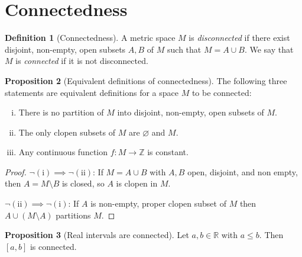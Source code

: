 \documentclass[10pt,fleqn]{article}
\newcommand{\reals}{\mathbb{R}}
\theoremstyle{definition} \newtheorem{defn}{Definition}[section]
\theoremstyle{plain}      \newtheorem{thm}[defn]{Theorem}
\theoremstyle{definition} \newtheorem{prop}[defn]{Proposition}
\theoremstyle{definition} \newtheorem{cor}[defn]{Corollary}
\theoremstyle{definition} \newtheorem{ex}[defn]{Example}
\theoremstyle{definition} \newtheorem{rem}[defn]{Remark}
\begin{document}
\section{Connectedness}

\begin{defn}[Connectedness]
    A metric space $M$ is \emph{disconnected} if there exist disjoint, non-empty, open subsets $A,B$ of $M$ such that $M=A\cup B$.
    We say that $M$ is \emph{connected} if it is not disconnected.
\end{defn}

\begin{prop}[Equivalent definitions of connectedness]
    The following three statements are equivalent definitions for a space $M$ to be connected:
    \begin{enumerate}[(i)]
        \item There is no partition of $M$ into disjoint, non-empty, open subsets of $M$.
        \item The only clopen subsets of $M$ are $\varnothing$ and $M$.
        \item Any continuous function $f:M\to\mathbb{Z}$ is constant.
    \end{enumerate}
\end{prop}

\begin{proof}
    $\neg(\text{i})\implies\neg(\text{ii})$: If $M=A\cup B$ with $A,B$ open, disjoint, and non empty, then $A=M\setminus B$ is closed, so $A$ is clopen in $M$.

    $\neg(\text{ii})\implies\neg(\text{i})$: If $A$ is non-empty, proper clopen subset of $M$ then \mbox{$A\cup(M\setminus A)$} partitions $M$.
\end{proof}

\begin{prop}[Real intervals are connected]\label{real-intervals-connected}
    Let $a,b\in\reals$ with $a\leq b$.
    Then $[a,b]$ is connected.
\end{prop}
\end{document}
